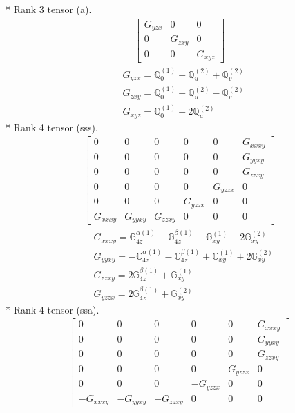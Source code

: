 \documentclass[fleqn,8pt,landscape]{jsarticle}
\begin{document}
* Rank 3 tensor (a).
\begin{align*}
\begin{bmatrix} G_{yzx} & 0 & 0 \\ 0 & G_{zxy} & 0 \\ 0 & 0 & G_{xyz} \end{bmatrix}
\end{align*}
\begin{align*}
& G_{yzx} = \mathbb{Q}_{0}^{(1)} - \mathbb{Q}_{u}^{(2)} + \mathbb{Q}_{v}^{(2)} \\
& G_{zxy} = \mathbb{Q}_{0}^{(1)} - \mathbb{Q}_{u}^{(2)} - \mathbb{Q}_{v}^{(2)} \\
& G_{xyz} = \mathbb{Q}_{0}^{(1)} + 2 \mathbb{Q}_{u}^{(2)}
\end{align*}
* Rank 4 tensor (sss).
\begin{align*}
\begin{bmatrix} 0 & 0 & 0 & 0 & 0 & G_{xxxy} \\ 0 & 0 & 0 & 0 & 0 & G_{yyxy} \\ 0 & 0 & 0 & 0 & 0 & G_{zzxy} \\ 0 & 0 & 0 & 0 & G_{yzzx} & 0 \\ 0 & 0 & 0 & G_{yzzx} & 0 & 0 \\ G_{xxxy} & G_{yyxy} & G_{zzxy} & 0 & 0 & 0 \end{bmatrix}
\end{align*}
\begin{align*}
& G_{xxxy} = \mathbb{G}_{4z}^{\alpha(1)} - \mathbb{G}_{4z}^{\beta(1)} + \mathbb{G}_{xy}^{(1)} + 2 \mathbb{G}_{xy}^{(2)} \\
& G_{yyxy} = - \mathbb{G}_{4z}^{\alpha(1)} - \mathbb{G}_{4z}^{\beta(1)} + \mathbb{G}_{xy}^{(1)} + 2 \mathbb{G}_{xy}^{(2)} \\
& G_{zzxy} = 2 \mathbb{G}_{4z}^{\beta(1)} + \mathbb{G}_{xy}^{(1)} \\
& G_{yzzx} = 2 \mathbb{G}_{4z}^{\beta(1)} + \mathbb{G}_{xy}^{(2)}
\end{align*}
* Rank 4 tensor (ssa).
\begin{align*}
\begin{bmatrix} 0 & 0 & 0 & 0 & 0 & G_{xxxy} \\ 0 & 0 & 0 & 0 & 0 & G_{yyxy} \\ 0 & 0 & 0 & 0 & 0 & G_{zzxy} \\ 0 & 0 & 0 & 0 & G_{yzzx} & 0 \\ 0 & 0 & 0 & - G_{yzzx} & 0 & 0 \\ - G_{xxxy} & - G_{yyxy} & - G_{zzxy} & 0 & 0 & 0 \end{bmatrix}
\end{align*}
\end{document}
